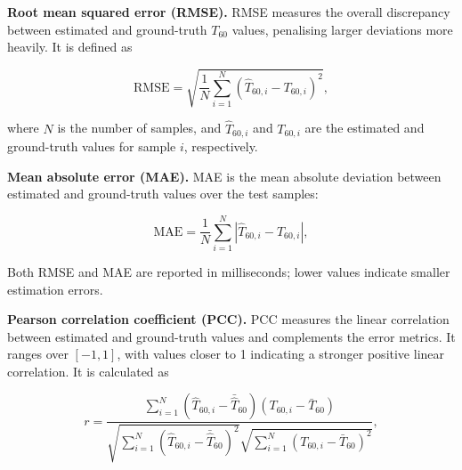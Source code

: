 \documentclass[a4paper,fleqn]{cas-sc}
\begin{document}


\textbf{Root mean squared error (RMSE).} RMSE measures the overall discrepancy between estimated and ground-truth $T_{60}$ values, penalising larger deviations more heavily. It is defined as



\begin{equation}
\mathrm{RMSE}=\sqrt{\frac{1}{N}\sum_{i=1}^{N}(\hat{T}_{60,i}-T_{60,i})^{2}}, \tag{22}\label{eq:rmse}
\end{equation}



\noindent where $N$ is the number of samples, and $\hat{T}_{60,i}$ and $T_{60,i}$ are the estimated and ground-truth values for sample $i$, respectively.



\textbf{Mean absolute error (MAE).} MAE is the mean absolute deviation between estimated and ground-truth values over the test samples:



\begin{equation}
\mathrm{MAE}=\frac{1}{N}\sum_{i=1}^{N}|\hat{T}_{60,i}-T_{60,i}|, \tag{23}\label{eq:mae}
\end{equation}



Both RMSE and MAE are reported in milliseconds; lower values indicate smaller estimation errors.



\textbf{Pearson correlation coefficient (PCC).} PCC measures the linear correlation between estimated and ground-truth values and complements the error metrics. It ranges over $[-1,1]$, with values closer to 1 indicating a stronger positive linear correlation. It is calculated as



\begin{equation}
r=\frac{\sum_{i=1}^{N}(\hat{T}_{60,i}-\bar{\hat{T}}_{60})(T_{60,i}-\bar{T}_{60})}{\sqrt{\sum_{i=1}^{N}(\hat{T}_{60,i}-\bar{\hat{T}}_{60})^{2}}\sqrt{\sum_{i=1}^{N}(T_{60,i}-\bar{T}_{60})^{2}}}, \tag{24}\label{eq:pcc}
\end{equation}
\end{document}
